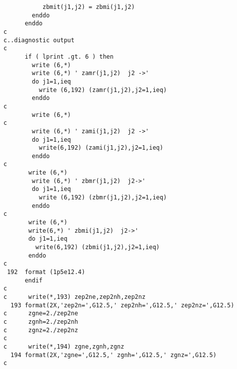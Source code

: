 \begin{verbatim}
           zbmit(j1,j2) = zbmi(j1,j2)
        enddo
      enddo
c
c..diagnostic output
c
      if ( lprint .gt. 6 ) then
        write (6,*)
        write (6,*) ' zamr(j1,j2)  j2 ->'
        do j1=1,ieq
          write (6,192) (zamr(j1,j2),j2=1,ieq)
        enddo
c
        write (6,*)
c
        write (6,*) ' zami(j1,j2)  j2 ->'
        do j1=1,ieq
          write(6,192) (zami(j1,j2),j2=1,ieq)
        enddo
c
       write (6,*)
        write (6,*) ' zbmr(j1,j2)  j2->'
        do j1=1,ieq
          write (6,192) (zbmr(j1,j2),j2=1,ieq)
        enddo
c
       write (6,*)
       write(6,*) ' zbmi(j1,j2)  j2->'
       do j1=1,ieq
         write(6,192) (zbmi(j1,j2),j2=1,ieq) 
       enddo
c
 192  format (1p5e12.4)
      endif
c
c      write(*,193) zep2ne,zep2nh,zep2nz
  193 format(2X,'zep2n=',G12.5,' zep2nh=',G12.5,' zep2nz=',G12.5)
c      zgne=2./zep2ne
c      zgnh=2./zep2nh
c      zgnz=2./zep2nz
c
c      write(*,194) zgne,zgnh,zgnz
  194 format(2X,'zgne=',G12.5,' zgnh=',G12.5,' zgnz=',G12.5)
c


\end{verbatim}

